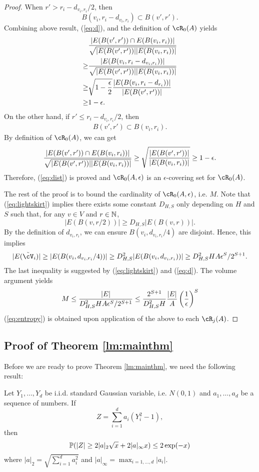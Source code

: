 \begin{proof}
	When $r'>r_i-d_{v_i,r_i}/2$, then 
	$$
	B(v_i,r_i-d_{v_i,r_i})\subset B(v',r').
	$$
	Combining above result, (\ref{eq:d}), and the definition of $\cR_0(A)$ yields
	\begin{align*}
	&{|E(B(v',r'))\cap E(B(v_i,r_i)) |\over\sqrt{|E(B(v',r'))||E(B(v_i,r_i))|}}\\
	\ge& {|E(B(v_i,r_i-d_{v_i,r_i})) |\over\sqrt{|E(B(v',r'))||E(B(v_i,r_i))|}} \\
	\ge& \sqrt{1-{\epsilon\over 2}}{|E(B(v_i,r_i-d_{r_i}))| \over |E(B(v',r'))|}\\
	\ge& 1-\epsilon.
	\end{align*}
	On the other hand, if $r'\le r_i-d_{v_i,r_i}/2$, then 
	\begin{align}
	B(v',r')\subset B(v_i,r_i).
	\end{align}
	By definition of $\cR_0(A)$, we can get
	$$
	{|E(B(v',r'))\cap E(B(v_i,r_i)) |\over\sqrt{|E(B(v',r'))||E(B(v_i,r_i))|}}\ge \sqrt{|E(B(v',r'))| \over |E(B(v_i,r_i))|}\ge  1-\epsilon.
	$$
	Therefore, (\ref{eq:dist}) is proved and $\cR_0(A,\epsilon)$ is an  $\epsilon$-covering set for $\cR_0(A)$.
	
	The rest of the proof is to bound the cardinality of $\cR_0(A,\epsilon)$, i.e. $M$.
	Note that (\ref{eq:lightskirt}) implies there exists some constant $D_{H,S}$ only depending on $H$ and $S$ such that, for any $v\in V$ and $r\in \mathbb{N}$,
	$$
	|E(B(v,r/2))|\ge D_{H,S} |E(B(v,r))|.
	$$
	By the definition of $d_{v_i, r_i}$, we can ensure $B(v_i,d_{v_i,r_i}/4)$ are disjoint.
	Hence, this implies
	$$
	|E(\tilde{\cV}_i) |\ge |E(B(v_i,d_{v_i,r_i}/4))|\ge D_{H,S}^2|E(B(v_i,d_{v_i,r_i}))|\ge D_{H,S}^2 HA\epsilon^S/2^{S+1}.
	$$
	The last inequality is suggested by (\ref{eq:lightskirt}) and (\ref{eq:d}). The volume argument yields
	$$
	M\le {|E|\over D_{H,S}^2 HA\epsilon^S/2^{S+1}}\le {2^{S+1}\over D_{H,S}^2H}{|E|\over A}\left({1\over \epsilon}\right)^S
	$$
	(\ref{eq:entropy}) is obtained upon application of the above to each $\cR_j(A)$.
\end{proof}

\subsection{Proof of Theorem \ref{lm:mainthm}}
	
Before we are ready to prove Theorem \ref{lm:mainthm}, we need the following result:

\begin{lemma}
	\label{lm:diffbd}
	Let $Y_1,\ldots,Y_d$ be i.i.d. standard Gaussian variable, i.e. $N(0,1)$ and $a_1,\ldots,a_d$ be a sequence of numbers.
	If 
	\begin{equation}
	Z=\sum_{i=1}^d a_i(Y_i^2-1),
	\end{equation}
	then
	\begin{equation}
	\mathbb{P}(|Z|\ge 2|a|_2\sqrt{x}+2|a|_\infty x)\le 2\exp(-x)
	\end{equation}
	where $|a|_2=\sqrt{\sum_{i=1}^d a_i^2}$ and $|a|_\infty=\max_{i=1,\ldots,d}|a_i|$.
\end{lemma}

